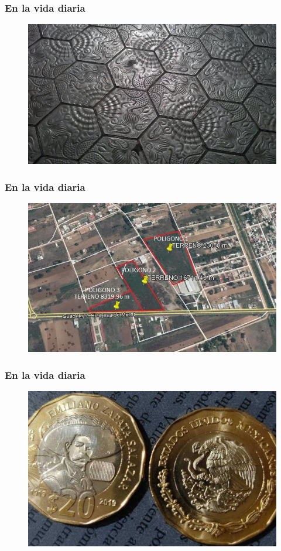 \documentclass[14pt]{beamer}
\begin{document}
\begin{frame}
\frametitle{En la vida diaria}
\begin{figure}
    \centering
    \includegraphics[scale=0.1]{Imagenes/Piso_hexagonal.jpg}
\end{figure}
\end{frame}
\begin{frame}
\frametitle{En la vida diaria}
\begin{figure}
    \centering
    \includegraphics[scale=0.5]{Imagenes/Terrenos_Poligonales.jpg}
\end{figure}
\end{frame}
\begin{frame}
\frametitle{En la vida diaria}
\begin{figure}
    \centering
    \includegraphics[scale=0.25]{Imagenes/Moneda_Conmemorativa.jpg}
\end{figure}
\end{frame}
\end{document}
